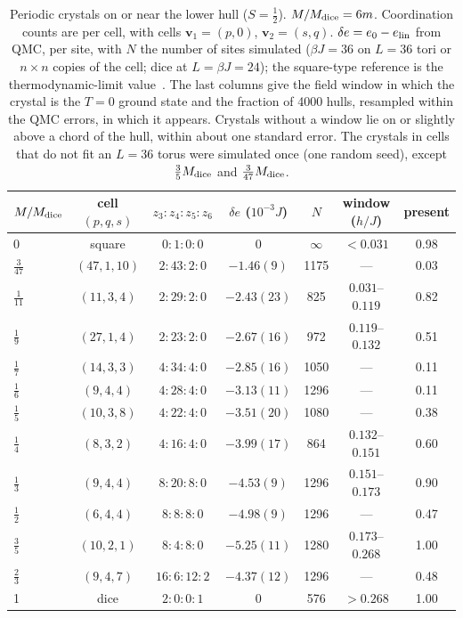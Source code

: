 \documentclass[prb,twocolumn,amsmath,amssymb,floatfix]{revtex4-2}
\newcommand{\Md}{M_{\rm dice}}
\begin{document}
\begin{table}[t]
\caption{Periodic crystals on or near the lower hull ($S=\frac12$). $M/\Md=6m$. Coordination counts are per cell, with cells $\mathbf v_1=(p,0)$, $\mathbf v_2=(s,q)$. $\delta e=e_0-e_{\rm lin}$ from QMC, per site, with $N$ the number of sites simulated ($\beta J=36$ on $L=36$ tori or $n\times n$ copies of the cell; dice at $L=\beta J=24$); the square-type reference is the thermodynamic-limit value~\cite{Sandvik1997}. The last columns give the field window in which the crystal is the $T=0$ ground state and the fraction of 4000 hulls, resampled within the QMC errors, in which it appears. Crystals without a window lie on or slightly above a chord of the hull, within about one standard error. The crystals in cells that do not fit an $L=36$ torus were simulated once (one random seed), except $\frac35\Md$ and $\frac3{47}\Md$.}
\label{tab:crystals}
\begin{ruledtabular}
\begin{tabular}{lcccccc}
$M/\Md$ & cell $(p,q,s)$ & $z_3{:}z_4{:}z_5{:}z_6$ & $\delta e$ ($10^{-3}J$) & $N$ & window ($h/J$) & present\\
\hline
0 & square & $0{:}1{:}0{:}0$ & 0 & $\infty$ & $<0.031$ & 0.98\\
$\frac3{47}$ & $(47,1,10)$ & $2{:}43{:}2{:}0$ & $-1.46(9)$\footnotemark[3] & 1175 & --- & 0.03\\
$\frac1{11}$ & $(11,3,4)$ & $2{:}29{:}2{:}0$ & $-2.43(23)$ & 825 & $0.031$--$0.119$ & 0.82\\
$\frac19$ & $(27,1,4)$ & $2{:}23{:}2{:}0$ & $-2.67(16)$ & 972 & $0.119$--$0.132$ & 0.51\\
$\frac17$ & $(14,3,3)$ & $4{:}34{:}4{:}0$ & $-2.85(16)$ & 1050 & --- & 0.11\\
$\frac16$ & $(9,4,4)$ & $4{:}28{:}4{:}0$ & $-3.13(11)$\footnotemark[1] & 1296 & --- & 0.11\\
$\frac15$ & $(10,3,8)$ & $4{:}22{:}4{:}0$ & $-3.51(20)$ & 1080 & --- & 0.38\\
$\frac14$ & $(8,3,2)$ & $4{:}16{:}4{:}0$ & $-3.99(17)$ & 864 & $0.132$--$0.151$ & 0.60\\
$\frac13$ & $(9,4,4)$ & $8{:}20{:}8{:}0$ & $-4.53(9)$\footnotemark[2] & 1296 & $0.151$--$0.173$ & 0.90\\
$\frac12$ & $(6,4,4)$ & $8{:}8{:}8{:}0$ & $-4.98(9)$ & 1296 & --- & 0.47\\
$\frac35$ & $(10,2,1)$ & $8{:}4{:}8{:}0$ & $-5.25(11)$\footnotemark[1] & 1280 & $0.173$--$0.268$ & 1.00\\
$\frac23$ & $(9,4,7)$ & $16{:}6{:}12{:}2$ & $-4.37(12)$ & 1296 & --- & 0.48\\
1 & dice & $2{:}0{:}0{:}1$ & 0 & 576 & $>0.268$ & 1.00\\
\end{tabular}
\end{ruledtabular}
\end{table}
\end{document}
